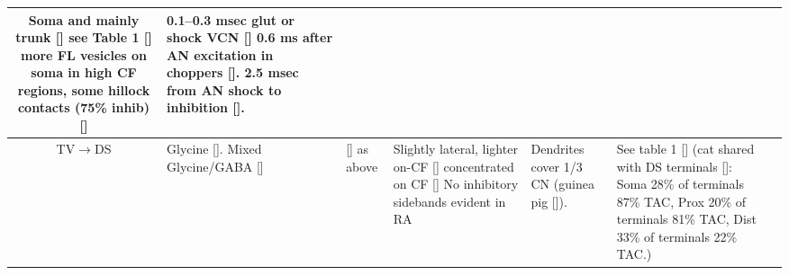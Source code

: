 \begin{longtable}{cYYYYYY}
Soma and mainly trunk [] 
see Table 1 [] 
more FL vesicles on soma in high CF regions, some hillock contacts (75\% inhib) []
                                & %
0.1--0.3 msec glut or shock VCN []
0.6 ms after AN excitation in choppers []. 
2.5 msec from AN shock to inhibition []. 
\\ \midrule
TV\ensuremath{\rightarrow}DS                        
                                & %
Glycine []. 
Mixed  Glycine/GABA []                 
                                & %
[]  as above                                  
                                & %
Slightly lateral, lighter on-CF []
concentrated on CF [] 
No inhibitory sidebands evident in RA                                   
                                & %
Dendrites cover 1/3 CN (guinea pig []).
                                & See table 1 []     
(cat shared with DS terminals []: 
Soma 28\% of terminals 87\% TAC,
Prox 20\% of terminals 81\% TAC,
Dist 33\% of terminals 22\% TAC.)
                      

\end{longtable}
